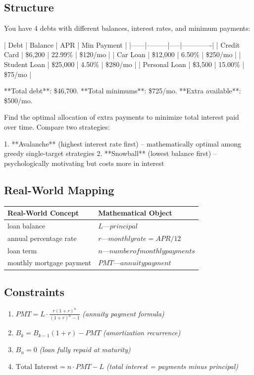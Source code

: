 \documentclass[11pt, a4paper]{article}
\begin{document}
\subsection{Structure}

You have 4 debts with different balances, interest rates, and minimum payments:

| Debt | Balance | APR | Min Payment |
|------|---------|-----|-------------|
| Credit Card | \$6,200 | 22.99\% | \$120/mo |
| Car Loan | \$12,000 | 6.50\% | \$250/mo |
| Student Loan | \$25,000 | 4.50\% | \$280/mo |
| Personal Loan | \$3,500 | 15.00\% | \$75/mo |

**Total debt**: \$46,700. **Total minimums**: \$725/mo. **Extra available**: \$500/mo.

Find the optimal allocation of extra payments to minimize total interest paid
over time. Compare two strategies:

1. **Avalanche** (highest interest rate first) -- mathematically optimal among
   greedy single-target strategies
2. **Snowball** (lowest balance first) -- psychologically motivating but costs
   more in interest

\subsection{Real-World Mapping}

\begin{longtable}{ll}
\toprule
\textbf{Real-World Concept} & \textbf{Mathematical Object} \\
\midrule
\endhead
loan balance & $L — principal$ \\
annual percentage rate & $r — monthly rate = APR/12$ \\
loan term & $n — number of monthly payments$ \\
monthly mortgage payment & $PMT — annuity payment$ \\
\bottomrule
\end{longtable}

\subsection{Constraints}

\begin{enumerate}
  \item $PMT = L \cdot \frac{r(1+r)^n}{(1+r)^n - 1}$
  \hfill \textit{(annuity payment formula)}
  \item $B_k = B_{k-1}(1+r) - PMT$
  \hfill \textit{(amortization recurrence)}
  \item $B_n = 0$
  \hfill \textit{(loan fully repaid at maturity)}
  \item $\text{Total Interest} = n \cdot PMT - L$
  \hfill \textit{(total interest = payments minus principal)}
\end{enumerate}
\end{document}
